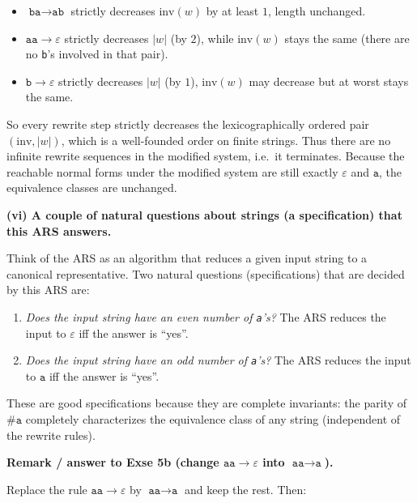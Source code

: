 \documentclass[12pt]{article}
\begin{document}
\begin{itemize}
  \item \(\texttt{ba}\to\texttt{ab}\) strictly decreases \(\mathrm{inv}(w)\) by at least \(1\), length unchanged.
  \item \(\texttt{aa}\to\varepsilon\) strictly decreases \(|w|\) (by \(2\)), while \(\mathrm{inv}(w)\) stays the same (there are no \texttt{b}'s involved in that pair).
  \item \(\texttt{b}\to\varepsilon\) strictly decreases \(|w|\) (by \(1\)), \(\mathrm{inv}(w)\) may decrease but at worst stays the same.
\end{itemize}

So every rewrite step strictly decreases the lexicographically ordered pair \((\mathrm{inv},|w|)\), which is a well-founded order on finite strings. Thus there are no infinite rewrite sequences in the modified system, i.e.\ it terminates. Because the reachable normal forms under the modified system are still exactly \(\varepsilon\) and \(\texttt{a}\), the equivalence classes are unchanged.

\bigskip

\textbf{(vi) A couple of natural questions about strings (a specification) that this ARS answers.}

Think of the ARS as an algorithm that reduces a given input string to a canonical representative. Two natural questions (specifications) that are decided by this ARS are:

\begin{enumerate}
  \item \emph{Does the input string have an even number of \texttt{a}'s?}  
  The ARS reduces the input to \(\varepsilon\) iff the answer is “yes”.
  \item \emph{Does the input string have an odd number of \texttt{a}'s?}  
  The ARS reduces the input to \(\texttt{a}\) iff the answer is “yes”.
\end{enumerate}

These are good specifications because they are complete invariants: the parity of \(\#\texttt{a}\) completely characterizes the equivalence class of any string (independent of the rewrite rules).

\bigskip

\textbf{Remark / answer to Exse 5b (change \(\texttt{aa}\to\varepsilon\) into \(\texttt{aa}\to\texttt{a}\)).}

Replace the rule \(\texttt{aa}\to\varepsilon\) by \(\texttt{aa}\to\texttt{a}\) and keep the rest. Then:
\end{document}
